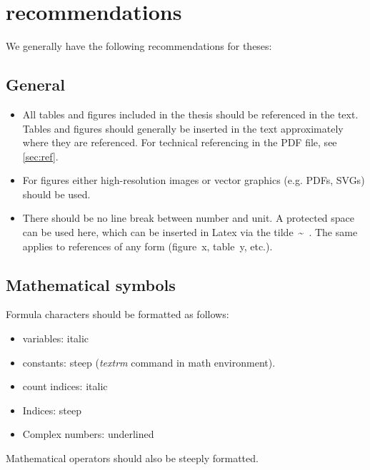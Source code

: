 \chapter{recommendations}
\label{chap:recommendations}

We generally have the following recommendations for theses:

\section{General}
\begin{itemize}
	\item All tables and figures included in the thesis should be referenced in the text. Tables and figures should generally be inserted in the text approximately where they are referenced. For technical referencing in the PDF file, see \autoref{sec:ref}.
	\item For figures either high-resolution images or vector graphics (e.g. PDFs, SVGs) should be used.
	\item There should be no line break between number and unit. A protected space can be used here, which can be inserted in Latex via the tilde~\textasciitilde~. The same applies to references of any form (figure~x, table~y, etc.).
\end{itemize}

\section{Mathematical symbols}
Formula characters should be formatted as follows:
\begin{itemize}
	\item variables: italic
	\item constants: steep (\textit{textrm} command in math environment).
	\item count indices: italic
	\item Indices: steep
	\item Complex numbers: underlined
\end{itemize}
Mathematical operators should also be steeply formatted.